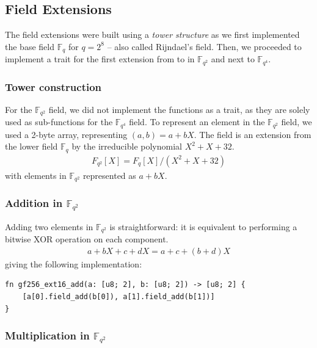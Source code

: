 \documentclass[11pt]{report}
\theoremstyle{definition}
\theoremstyle{plain}
\begin{document}
\subsection{Field Extensions}\label{sub:field_extensions}
The field extensions were built using a \textit{tower structure} as we first implemented the base field $\mathbb{F}_{q}$ for $q=2^8$ -- also called Rijndael's field. Then, we proceeded to implement a trait for the first extension from  to \rust{[u8; 2]} in $\mathbb{F}_{q^2}$ and next to $\mathbb{F}_{q^4}$.

\subsubsection{Tower construction}

For the $\mathbb{F}_{q^2}$ field, we did not implement the functions as a trait, as they are solely used as sub-functions for the $\mathbb{F}_{q^4}$ field. To represent an element in the $\mathbb{F}_{q^2}$ field, we used a 2-byte array, representing $(a, b) = a + bX$. The field is an extension from the lower field $\mathbb{F}_q$ by the irreducible polynomial $X^2 + X + 32$.
\begin{align}
  F_{q^2}[X] = F_q[X] / (X^2 + X + 32)
\end{align}
with elements in $\mathbb{F}_{q^2}$ represented as $a + bX$.

\subsubsection*{Addition in $\mathbb{F}_{q^2}$}

Adding two elements in $\mathbb{F}_{q^2}$ is straightforward: it is equivalent to performing a bitwise XOR operation on each component.
\begin{align*}
  a + bX + c + dX = a+c + (b+d)X
\end{align*}
giving the following implementation:
\begin{verbatim}
fn gf256_ext16_add(a: [u8; 2], b: [u8; 2]) -> [u8; 2] {
    [a[0].field_add(b[0]), a[1].field_add(b[1])]
}
\end{verbatim}

\subsubsection*{Multiplication in $\mathbb{F}_{q^2}$}
\end{document}
